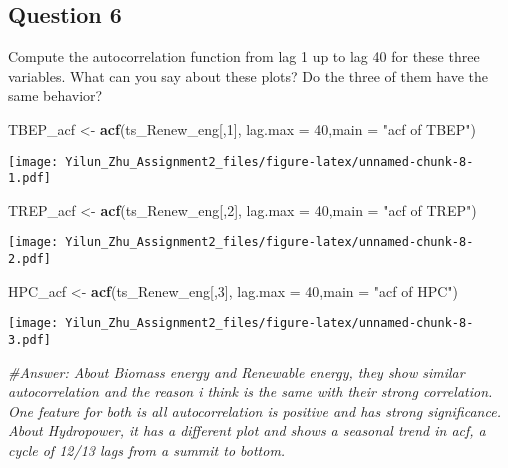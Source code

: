 \documentclass[
]{article}
\newenvironment{Shaded}{\begin{snugshade}}{\end{snugshade}}
\newcommand{\AttributeTok}[1]{\textcolor[rgb]{0.13,0.29,0.53}{#1}}
\newcommand{\CommentTok}[1]{\textcolor[rgb]{0.56,0.35,0.01}{\textit{#1}}}
\newcommand{\DecValTok}[1]{\textcolor[rgb]{0.00,0.00,0.81}{#1}}
\newcommand{\FunctionTok}[1]{\textcolor[rgb]{0.13,0.29,0.53}{\textbf{#1}}}
\newcommand{\NormalTok}[1]{#1}
\newcommand{\OtherTok}[1]{\textcolor[rgb]{0.56,0.35,0.01}{#1}}
\newcommand{\StringTok}[1]{\textcolor[rgb]{0.31,0.60,0.02}{#1}}
\begin{document}
\hypertarget{question-6}{%
\subsection{Question 6}\label{question-6}}

Compute the autocorrelation function from lag 1 up to lag 40 for these
three variables. What can you say about these plots? Do the three of
them have the same behavior?

\begin{Shaded}
\begin{Highlighting}[]
\NormalTok{TBEP\_acf }\OtherTok{\textless{}{-}} \FunctionTok{acf}\NormalTok{(ts\_Renew\_eng[,}\DecValTok{1}\NormalTok{], }\AttributeTok{lag.max =} \DecValTok{40}\NormalTok{,}\AttributeTok{main =} \StringTok{"acf of TBEP"}\NormalTok{)}
\end{Highlighting}
\end{Shaded}

\texttt{[image: Yilun\_Zhu\_Assignment2\_files/figure-latex/unnamed-chunk-8-1.pdf]}

\begin{Shaded}
\begin{Highlighting}[]
\NormalTok{TREP\_acf }\OtherTok{\textless{}{-}} \FunctionTok{acf}\NormalTok{(ts\_Renew\_eng[,}\DecValTok{2}\NormalTok{], }\AttributeTok{lag.max =} \DecValTok{40}\NormalTok{,}\AttributeTok{main =} \StringTok{"acf of TREP"}\NormalTok{)}
\end{Highlighting}
\end{Shaded}

\texttt{[image: Yilun\_Zhu\_Assignment2\_files/figure-latex/unnamed-chunk-8-2.pdf]}

\begin{Shaded}
\begin{Highlighting}[]
\NormalTok{HPC\_acf }\OtherTok{\textless{}{-}} \FunctionTok{acf}\NormalTok{(ts\_Renew\_eng[,}\DecValTok{3}\NormalTok{], }\AttributeTok{lag.max =} \DecValTok{40}\NormalTok{,}\AttributeTok{main =} \StringTok{"acf of HPC"}\NormalTok{)}
\end{Highlighting}
\end{Shaded}

\texttt{[image: Yilun\_Zhu\_Assignment2\_files/figure-latex/unnamed-chunk-8-3.pdf]}

\begin{Shaded}
\begin{Highlighting}[]
\CommentTok{\#Answer: About Biomass energy and Renewable energy, they show similar autocorrelation and the reason i think is the same with their strong correlation. One feature for both is all autocorrelation is positive and has strong significance. About Hydropower, it has a different plot and shows a seasonal trend in acf, a cycle of 12/13 lags from a summit to bottom.}
\end{Highlighting}
\end{Shaded}
\end{document}
